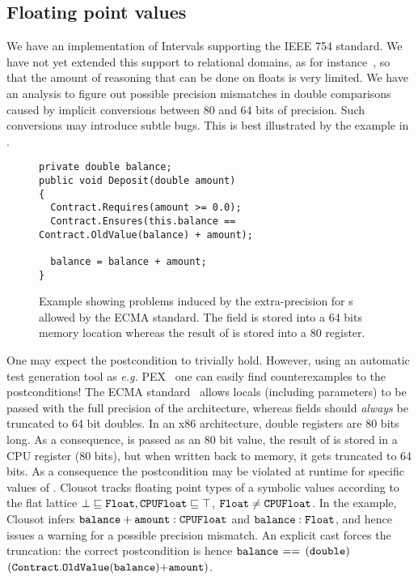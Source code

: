 \documentclass{llncs}
\begin{document}
\subsection{Floating point values}
We have an implementation of Intervals supporting the IEEE 754
standard.  We have not yet extended this support to relational
domains, as for instance~\cite{Mine04,ChenMineCousot08}, so that the
amount of reasoning that can be done on floats is very limited.  We
have an analysis to figure out possible precision mismatches in double
comparisons caused by implicit conversions
between 80 and 64 bits of precision. Such conversions may introduce
subtle bugs.  This is best illustrated by the example in
.

\begin{figure}[t]
\begin{lstlisting}
private double balance;
public void Deposit(double amount)
{
  Contract.Requires(amount >= 0.0);   
  Contract.Ensures(this.balance == Contract.OldValue(balance) + amount);

  balance = balance + amount;
}
\end{lstlisting}
\caption{Example showing problems induced by the extra-precision for s allowed by the ECMA standard.
The field  is stored into a 64 bits memory location whereas the result of  is stored into a 80 register.}
\label{fig:balance}
\end{figure}


One may expect the postcondition to trivially hold.  However, using an
automatic test generation tool as \emph{e.g.}
PEX~\cite{TillmannPeli08} one can easily find counterexamples to the
postconditions!  The ECMA standard~\cite{ecma} allows locals
(including parameters) to be passed with the full precision of the
architecture, whereas fields should \emph{always} be truncated to 64
bit doubles.  In an x86 architecture, double registers are 80 bits
long.  As a consequence,  is passed as an 80 bit value,
the result of  is stored in a CPU register
(80 bits), but when written back to memory, it gets truncated to 64
bits.  As a consequence the postcondition may be violated at runtime
for specific values of .  Clousot tracks floating point
types of a symbolic values according to the flat lattice $\bot
\sqsubseteq \mathtt{Float}, \mathtt{CPUFloat} \sqsubseteq \top$,
$\mathtt{Float} \neq \mathtt{CPUFloat}$.  In the example, Clousot infers
$\mathtt{balance + amount}: \mathtt{CPUFloat}$ and $\mathtt{balance} :
\mathtt{Float}$, and hence issues a warning for a possible precision
mismatch.  An explicit cast forces the truncation: the correct
postcondition is hence $\mathtt{balance}$ $\mathtt{==}$ $\mathtt{(double)}$
$\mathtt{(Contract.OldValue(balance)} \mathtt{+ amount)}$.
\end{document}
